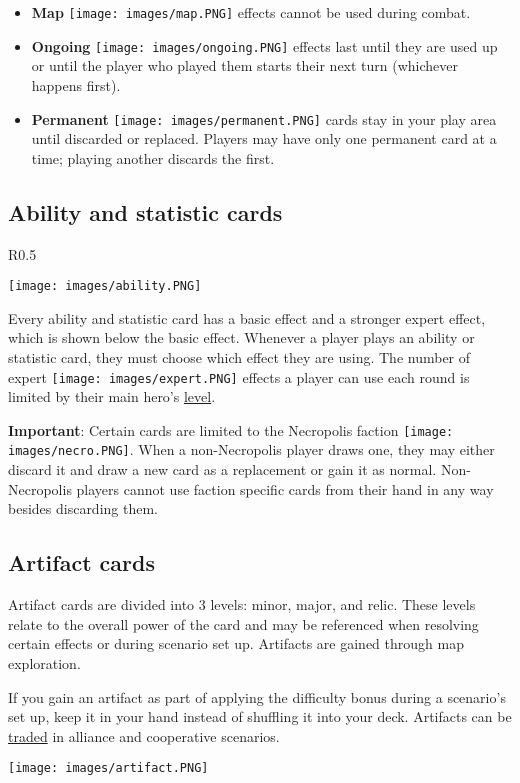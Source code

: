 \documentclass[12pt]{article}
\begin{document}
\begin{enumerate}
\begin{itemize}
        \item \textbf{Map} \texttt{[image: images/map.PNG]} effects cannot be used during combat.  
        \item \textbf{Ongoing} \texttt{[image: images/ongoing.PNG]} effects last until they are used up or until the player who played them starts their next turn (whichever happens first).
        \item \textbf{Permanent} \texttt{[image: images/permanent.PNG]} cards stay in your play area until discarded or replaced. Players may have only one permanent card at a time; playing another discards the first.
    \end{itemize}

\end{enumerate}

\clearpage
\subsection*{\hypertarget{Ability}{Ability and statistic cards}}
\begin{wrapfigure}{R}{0.5\textwidth}
 
    \texttt{[image: images/ability.PNG]}

\end{wrapfigure}
Every ability and statistic card has a basic effect and a stronger expert effect, which is shown below the basic effect. Whenever a player plays an ability or statistic card, they must choose which effect they are using. The number of expert \texttt{[image: images/expert.PNG]} effects a player can use each round is limited by their main hero’s \hyperlink{Level}{level}.\par
\textbf{Important}: Certain cards are limited to the Necropolis faction \texttt{[image: images/necro.PNG]}. When a non-Necropolis player draws one, they may either discard it and draw a new card as a replacement or gain it as normal. Non-Necropolis players cannot use faction specific cards from their hand in any way besides discarding them.
\subsection*{Artifact cards}
Artifact cards are divided into 3 levels: minor, major, and relic. These levels relate to the overall power of the card and may be referenced when resolving certain effects or during scenario set up. Artifacts are gained through map exploration.\par
If you gain an artifact as part of applying the difficulty bonus during a scenario’s set up, keep it in your hand instead of shuffling it into your deck.
Artifacts can be \hyperlink{Trading}{traded} in alliance and cooperative scenarios.\par
\texttt{[image: images/artifact.PNG]}
\end{document}
